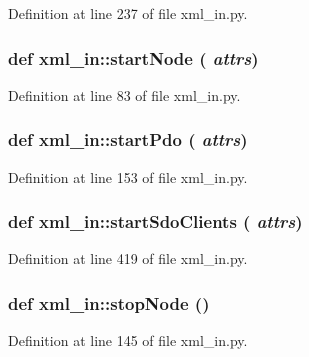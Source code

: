 Definition at line 237 of file xml\_\-in.py.\hypertarget{namespacexml__in_170b4feee4419d719dec07845bd6f591}{
\subsubsection[startNode]{\setlength{\rightskip}{0pt plus 5cm}def xml\_\-in::start\-Node ( {\em attrs})}}
\label{namespacexml__in_170b4feee4419d719dec07845bd6f591}




Definition at line 83 of file xml\_\-in.py.\hypertarget{namespacexml__in_05f630ab0531cab1ef4649ca8b6a662f}{
\subsubsection[startPdo]{\setlength{\rightskip}{0pt plus 5cm}def xml\_\-in::start\-Pdo ( {\em attrs})}}
\label{namespacexml__in_05f630ab0531cab1ef4649ca8b6a662f}




Definition at line 153 of file xml\_\-in.py.\hypertarget{namespacexml__in_3f4a758fcb8c3ffea6e7439f30ccf0fb}{
\subsubsection[startSdoClients]{\setlength{\rightskip}{0pt plus 5cm}def xml\_\-in::start\-Sdo\-Clients ( {\em attrs})}}
\label{namespacexml__in_3f4a758fcb8c3ffea6e7439f30ccf0fb}




Definition at line 419 of file xml\_\-in.py.\hypertarget{namespacexml__in_14f6a38437b8d44f75a7838414f926f8}{
\subsubsection[stopNode]{\setlength{\rightskip}{0pt plus 5cm}def xml\_\-in::stop\-Node ()}}
\label{namespacexml__in_14f6a38437b8d44f75a7838414f926f8}




Definition at line 145 of file xml\_\-in.py.